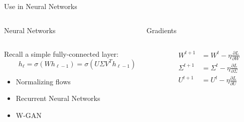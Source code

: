 \begin{frame}{Use in Neural Networks}
	\begin{columns}
		\begin{column}{0.47\textwidth}
			\alert{Neural Networks}
		\end{column}
		\begin{column}{0.47\textwidth}
			\alert{Gradients}
		\end{column}
	\end{columns}
	\vspace{1em}

	\begin{columns}
		\begin{column}{0.47\textwidth}
			Recall a simple fully-connected layer:
			\begin{equation*}
 				h_{\ell} = \sigma (Wh_{\ell-1}) = \sigma \left( U\Sigma V^T h_{\ell-1}\right)
			\end{equation*}

			\begin{itemize}
				\item Normalizing flows
				\item Recurrent Neural Networks
				\item W-GAN
			\end{itemize}
		\end{column}

		\begin{column}{0.47\textwidth}
			\begin{align*}	
				W^{t+1} &= W^{t} - \eta \frac{\partial L}{\partial W}\\
				\Sigma^{t+1} &= \Sigma^{t} - \eta \frac{\partial L}{\partial \Sigma}\\
				U^{t+1} &= U^{t} - \eta \frac{\partial L}{\partial U}\\
			\end{align*}
		\end{column}
	\end{columns}
\end{frame}

